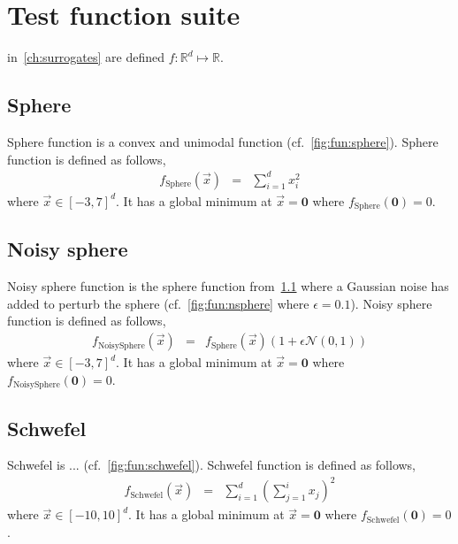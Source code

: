 
\chapter{Test function suite}\label{app:fun} 
 in~\cref{ch:surrogates} are defined $f:\mathbb{R}^d\mapsto\mathbb{R}$.


\section{Sphere }\label{app:fun:sphere}
Sphere function is a convex and unimodal function (cf.~\cref{fig:fun:sphere}). Sphere function is defined as follows,
\begin{eqnarray}
	f_{\textrm{Sphere}}(\vec{x})&=&\sum_{i=1}^d x_i^2
\end{eqnarray} where $\vec{x}\in[-3,7]^d$.
It has a global minimum at $\vec{x}=\textbf{0}$ where $f_{\textrm{Sphere}}(\textbf{0})=0$. 

\section{Noisy sphere}\label{app:fun:nsphere}
Noisy sphere function is the sphere function from~\cref{app:fun:sphere} where a Gaussian noise has added to perturb the sphere (cf.~\cref{fig:fun:nsphere} where $\epsilon=0.1$). Noisy sphere function is defined as follows,
\begin{eqnarray}
	f_{\textrm{NoisySphere}}(\vec{x})&=&f_{\textrm{Sphere}}(\vec{x})\left(1+\epsilon\mathcal{N}(0,1)\right)
\end{eqnarray} where $\vec{x}\in[-3,7]^d$.
It has a global minimum at $\vec{x}=\textbf{0}$ where $f_{\textrm{NoisySphere}}(\textbf{0})=0$.

\section{Schwefel}\label{app:fun:schwefel}
Schwefel is ... (cf.~\cref{fig:fun:schwefel}). Schwefel function is defined as follows,
\begin{eqnarray}
	f_{\textrm{Schwefel}}(\vec{x})&=&\sum_{i=1}^d\left(\sum_{j=1}^i x_j\right)^2
\end{eqnarray} where $\vec{x}\in[-10,10]^d$.
It has a global minimum at $\vec{x}=\textbf{0}$ where $f_{\textrm{Schwefel}}(\textbf{0})=0$.

